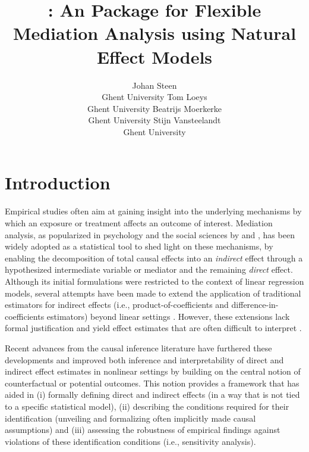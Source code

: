 \documentclass[nojss]{jss}
\author{Johan Steen \\ Ghent University \And
        \hspace{-.5in}Tom Loeys \\ \hspace{-.5in}Ghent University \And
        \hspace{-.7in}Beatrijs Moerkerke \\ \hspace{-.7in}Ghent University \And
        \hspace{-.4in}Stijn Vansteelandt \\ \hspace{-.4in}Ghent University}
\title{\pkg{Medflex}: An \proglang{R} Package for Flexible Mediation Analysis using Natural Effect Models}
\begin{document}



\section[Introduction]{Introduction}
Empirical studies often aim at gaining insight into the underlying mechanisms by which an exposure or treatment affects an outcome of interest. Mediation analysis, as popularized in psychology and the social sciences by \cite{Judd1981a} and \cite{Baron1986}, has been widely adopted as a statistical tool to shed light on these mechanisms, by enabling the decomposition of total causal effects into an \textit{indirect} effect through a hypothesized intermediate variable or mediator and the remaining \textit{direct} effect. Although its initial formulations were restricted to the context of linear regression models, several attempts have been made to extend the application of traditional estimators for indirect effects (i.e., product-of-coefficients and difference-in-coefficients estimators) beyond linear settings \citep[e.g.,][]{MacKinnon1993, MacKinnon2007c, Hayes2010, Iacobucci2012}.
However, these extensions lack formal justification and yield effect estimates that are often difficult to interpret \citep[e.g.,][]{Pearl2012}.
\par Recent advances from the causal inference literature \citep[e.g.,][]{Albert2008,Albert2011,Avin2005,Imai2010a,Pearl2001,Pearl2012,Greenland1992,VanderWeele2009b,VanderWeele2010} have furthered these developments and improved both inference and interpretability of direct and indirect effect estimates in nonlinear settings by building on the central notion of counterfactual or potential outcomes. This notion provides a framework that has aided in (i) formally defining direct and indirect effects (in a way that is not tied to a specific statistical model), (ii) describing the conditions required for their identification (unveiling and formalizing often implicitly made causal assumptions) and (iii) assessing the robustness of empirical findings against violations of these identification conditions (i.e., sensitivity analysis). 
\end{document}

